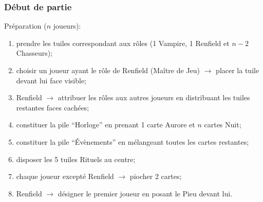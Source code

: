 \documentclass[11pt]{beamer}
\begin{document}
\begin{frame}
	\frametitle{Début de partie}
	\label{frame:start}
	
	Préparation ($n$ joueurs):
	\begin{enumerate}
		\item prendre les tuiles correspondant aux rôles (1 Vampire, 1 Renfield et $n-2$ Chasseurs);
		\item choisir un joueur ayant le rôle de Renfield (Maître de Jeu) $\rightarrow$ placer la tuile devant lui face visible;
		\item Renfield $\rightarrow$ attribuer les rôles aux autres joueurs en distribuant les tuiles restantes faces cachées;
		\item constituer la pile \enquote{Horloge} en prenant 1 carte Aurore et $n$ cartes Nuit;
		\item constituer la pile \enquote{Évènements} en mélangeant toutes les cartes restantes;
		\item disposer les 5 tuiles Rituels au centre;
		\item chaque joueur excepté Renfield $\rightarrow$ piocher 2 cartes;
		\item Renfield $\rightarrow$ désigner le premier joueur en posant le Pieu devant lui.
	\end{enumerate}
\end{frame}

%	
%
%	
\end{document}
